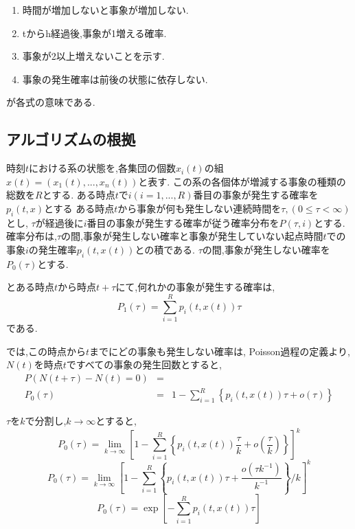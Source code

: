 \documentclass[12pt]{jsreport}
\begin{document}
\begin{enumerate}
 \item 時間が増加しないと事象が増加しない.
 \item tからh経過後,事象が1増える確率.
 \item 事象が2以上増えないことを示す.
 \item 事象の発生確率は前後の状態に依存しない.
\end{enumerate}

が各式の意味である.

\subsection{アルゴリズムの根拠}
時刻$t$における系の状態を,各集団の個数$x_i(t)$の組$x(t)=(x_1(t),...,x_n(t))$と表す.
この系の各個体が増減する事象の種類の総数を$R$とする.
ある時点$t$で$i(i=1,...,R)$番目の事象が発生する確率を$p_i(t,x)$とする
ある時点$t$から事象が何も発生しない連続時間を$\tau,(0 \leq \tau < \infty)$とし,
$\tau$が経過後に$i$番目の事象が発生する確率が従う確率分布を$P(\tau,i)$とする.
確率分布は,$\tau$の間,事象が発生しない確率と事象が発生していない起点時間$t$での事象$i$の発生確率$p_i(t,x(t))$との積である.
$\tau$の間,事象が発生しない確率を$P_0(\tau)$とする.

とある時点$t$から時点$t+\tau$にて,何れかの事象が発生する確率は,
\begin{equation}
 P_1(\tau) = \sum^{R}_{i=1} p_i(t,x(t))\tau
\end{equation}
である.

では,この時点から$t$までにどの事象も発生しない確率は,
Poisson過程の定義より,$N(t)$を時点$t$ですべての事象の発生回数とすると,
\begin{eqnarray}
 P(N(t+\tau)-N(t) = 0) &=& \nonumber \\
 P_0(\tau) &=& 1 - \sum^{R}_{i=1} \left\{ p_i(t,x(t))\tau + o(\tau) \right\}
\end{eqnarray}

$\tau$を$k$で分割し,$k \to \infty$とすると,
\begin{equation}
 P_0(\tau) = \lim_{k \to \infty} \left[1 - \sum^{R}_{i=1} \left\{ p_i(t,x(t))\frac{\tau}{k} + o\left(\frac{\tau}{k}\right) \right\} \right]^k
\end{equation}
\begin{equation}
 P_0(\tau) = \lim_{k \to \infty} \left[1 - \sum^{R}_{i=1} \left\{ p_i(t,x(t))\tau + \frac{o(\tau k^{-1})}{k^{-1}} \right\}/k \right]^k
\end{equation}
\begin{equation}
 P_0(\tau) = \exp\left[- \sum^{R}_{i=1} p_i(t,x(t))\tau \right] \label{dist_exp}
\end{equation}
\end{document}
